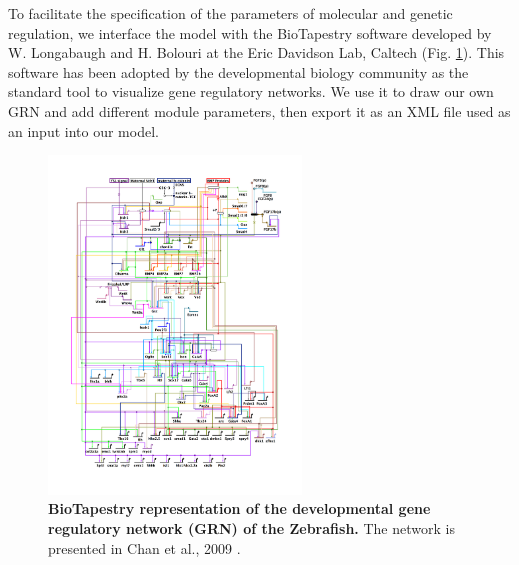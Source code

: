 To facilitate the specification of the parameters of molecular and genetic regulation, we interface the model with the BioTapestry software developed by W. Longabaugh and H. Bolouri at the Eric Davidson Lab, Caltech \cite{Longabaugh:2005bq}\cite{Longabaugh:2009kp} (Fig. \ref{model_grns_zebra_grn_yuh}). This software has been adopted by the developmental biology community as the standard tool to visualize gene regulatory networks. We use it to draw our own GRN and add different module parameters, then export it as an XML file used as an input into our model.
\begin{figure}
\begin{center}
\includegraphics[width=0.6\textwidth]{../../images/model_grns/zebra_grn_yuh.png}
\end{center}
\caption{\textbf{BioTapestry representation of the developmental gene regulatory network (GRN) of the Zebrafish.} The network is presented in Chan et al., 2009 \cite{Chan:2009er}.}
\label{model_grns_zebra_grn_yuh}
\end{figure}
